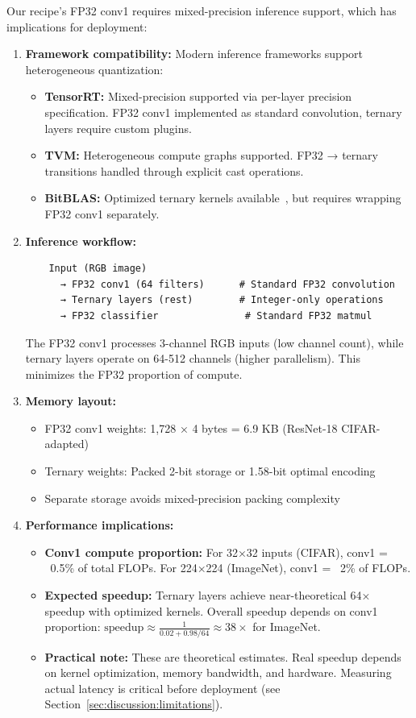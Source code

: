 Our recipe's FP32 conv1 requires mixed-precision inference support, which has implications for deployment:

\begin{enumerate}
    \item \textbf{Framework compatibility:} Modern inference frameworks support heterogeneous quantization:
    \begin{itemize}
        \item \textbf{TensorRT:} Mixed-precision supported via per-layer precision specification. FP32 conv1 implemented as standard convolution, ternary layers require custom plugins.
        \item \textbf{TVM:} Heterogeneous compute graphs supported. FP32 → ternary transitions handled through explicit cast operations.
        \item \textbf{BitBLAS:} Optimized ternary kernels available~\cite{bitblas}, but requires wrapping FP32 conv1 separately.
    \end{itemize}

    \item \textbf{Inference workflow:}
    \begin{verbatim}
    Input (RGB image)
      → FP32 conv1 (64 filters)      # Standard FP32 convolution
      → Ternary layers (rest)        # Integer-only operations
      → FP32 classifier               # Standard FP32 matmul
    \end{verbatim}

    The FP32 conv1 processes 3-channel RGB inputs (low channel count), while ternary layers operate on 64-512 channels (higher parallelism). This minimizes the FP32 proportion of compute.

    \item \textbf{Memory layout:}
    \begin{itemize}
        \item FP32 conv1 weights: 1,728 × 4 bytes = 6.9 KB (ResNet-18 CIFAR-adapted)
        \item Ternary weights: Packed 2-bit storage or 1.58-bit optimal encoding
        \item Separate storage avoids mixed-precision packing complexity
    \end{itemize}

    \item \textbf{Performance implications:}
    \begin{itemize}
        \item \textbf{Conv1 compute proportion:} For 32×32 inputs (CIFAR), conv1 = ~0.5\% of total FLOPs. For 224×224 (ImageNet), conv1 = ~2\% of FLOPs.
        \item \textbf{Expected speedup:} Ternary layers achieve near-theoretical 64× speedup with optimized kernels. Overall speedup depends on conv1 proportion: $\text{speedup} \approx \frac{1}{0.02 + 0.98/64} \approx 38\times$ for ImageNet.
        \item \textbf{Practical note:} These are theoretical estimates. Real speedup depends on kernel optimization, memory bandwidth, and hardware. Measuring actual latency is critical before deployment (see Section~\ref{sec:discussion:limitations}).
    \end{itemize}


\end{enumerate}

